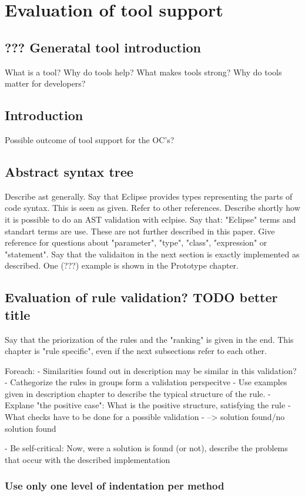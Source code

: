 \chapter{Evaluation of tool support}
\label{Evaluation}
\section{??? Generatal tool introduction}
What is a tool? Why do tools help? What makes tools strong? Why do tools matter for developers?
\section{Introduction}
Possible outcome of tool support for the OC's?
\section{Abstract syntax tree}
Describe ast generally. Say that Eclipse provides types representing the parts of code syntax. This is seen as given. 
Refer to other references.
Describe shortly how it is possible to do an AST validation with eclpise. Say that: "Eclipse" terms and standart terms are use. These are not further described in this paper. Give reference for questions about "parameter", "type", "class", "expression" or "statement".
Say that the validaiton in the next section is exactly implemented as described. One (???) example is shown in the Prototype chapter.
\section{Evaluation of rule validation? TODO better title}
Say that the priorization of the rules and the "ranking" is given in the end. This chapter is "rule specific", even if the next subsections refer to each other.

Foreach: 
 - Similarities found out in description may be similar in this validation?
 - Cathegorize the rules in groups form a validation perspecitve
 - Use examples given in description chapter to describe the typical structure of the rule. 
 - Explane "the positive case": What is the positive structure, satisfying the rule
 - What checks have to be done for a possible validation
 - --> solution found/no solution found
 
 - Be self-critical: Now, were a solution is found (or not), describe the problems that occur with the described implementation
\subsection{Use only one level of indentation per method}
